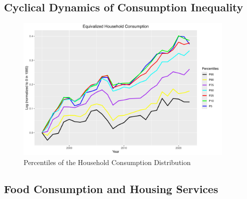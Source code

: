 \documentclass{article}
\begin{document}
\subsection{Cyclical Dynamics of Consumption Inequality}

\begin{figure}
    \centering
    \includegraphics[width=0.95\textwidth]{Fig_7/Fig_7_percentiles_a1995.png}
    \caption{Percentiles of the Household Consumption Distribution}
    \label{fig:Consumption_cyclic}
\end{figure}

\subsection{Food Consumption and Housing Services}
\end{document}
